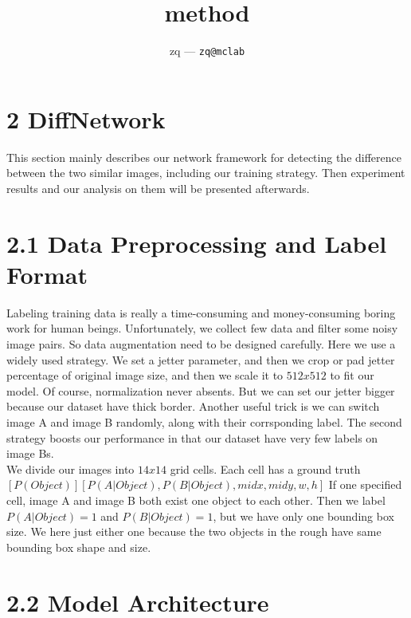\documentclass[12pt]{article}
\title{
	method
}
\author{
	zq --- \texttt{zq@mclab}
}
\begin{document}
\maketitle

\section{2 DiffNetwork}

This section mainly describes our network framework for detecting the difference between the two similar images, including our training strategy. Then experiment results and our analysis on them will be presented afterwards.\\

\section{2.1 Data Preprocessing and Label Format}

Labeling training data is really a time-consuming and money-consuming boring work for human beings. Unfortunately, we collect few data and filter some noisy image pairs. So data augmentation need to be designed carefully. Here we use a widely used strategy. We set a jetter parameter, and then we crop or pad jetter percentage of original image size, and then we scale it to $512x512$ to fit our model. Of course, normalization never absents. But we can set our jetter bigger because our dataset have thick border. Another useful trick is we can switch image A and image B randomly, along with their corrsponding label. The second strategy boosts our performance in that our dataset have very few labels on image Bs.\\

We divide our images into $14x14$ grid cells. Each cell has a ground truth $[P(Object)][P(A|Object), P(B|Object), midx, midy, w, h]$ If one specified cell, image A and image B both exist one object to each other. Then we label $P(A|Object)=1$ and $P(B|Object)=1$, but we have only one bounding box size. We here just either one because the two objects in the rough have same bounding box shape and size.\\





\section{2.2 Model Architecture}
\end{document}
